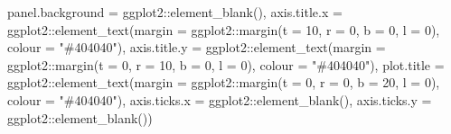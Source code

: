 \documentclass[
]{book}
\newenvironment{Shaded}{\begin{snugshade}}{\end{snugshade}}
\newcommand{\AttributeTok}[1]{\textcolor[rgb]{0.77,0.63,0.00}{#1}}
\newcommand{\DecValTok}[1]{\textcolor[rgb]{0.00,0.00,0.81}{#1}}
\newcommand{\FunctionTok}[1]{\textcolor[rgb]{0.00,0.00,0.00}{#1}}
\newcommand{\NormalTok}[1]{#1}
\newcommand{\SpecialCharTok}[1]{\textcolor[rgb]{0.00,0.00,0.00}{#1}}
\newcommand{\StringTok}[1]{\textcolor[rgb]{0.31,0.60,0.02}{#1}}
\begin{document}
\begin{Shaded}
\begin{Highlighting}[]
               \AttributeTok{panel.background =}\NormalTok{ ggplot2}\SpecialCharTok{::}\FunctionTok{element\_blank}\NormalTok{(),}
               \AttributeTok{axis.title.x =}\NormalTok{ ggplot2}\SpecialCharTok{::}\FunctionTok{element\_text}\NormalTok{(}\AttributeTok{margin =}\NormalTok{ ggplot2}\SpecialCharTok{::}\FunctionTok{margin}\NormalTok{(}\AttributeTok{t =} \DecValTok{10}\NormalTok{, }\AttributeTok{r =} \DecValTok{0}\NormalTok{, }\AttributeTok{b =} \DecValTok{0}\NormalTok{, }\AttributeTok{l =} \DecValTok{0}\NormalTok{), }\AttributeTok{colour =} \StringTok{"\#404040"}\NormalTok{),}
               \AttributeTok{axis.title.y =}\NormalTok{ ggplot2}\SpecialCharTok{::}\FunctionTok{element\_text}\NormalTok{(}\AttributeTok{margin =}\NormalTok{ ggplot2}\SpecialCharTok{::}\FunctionTok{margin}\NormalTok{(}\AttributeTok{t =} \DecValTok{0}\NormalTok{, }\AttributeTok{r =} \DecValTok{10}\NormalTok{, }\AttributeTok{b =} \DecValTok{0}\NormalTok{, }\AttributeTok{l =} \DecValTok{0}\NormalTok{), }\AttributeTok{colour =} \StringTok{"\#404040"}\NormalTok{),}
               \AttributeTok{plot.title =}\NormalTok{ ggplot2}\SpecialCharTok{::}\FunctionTok{element\_text}\NormalTok{(}\AttributeTok{margin =}\NormalTok{ ggplot2}\SpecialCharTok{::}\FunctionTok{margin}\NormalTok{(}\AttributeTok{t =} \DecValTok{0}\NormalTok{, }\AttributeTok{r =} \DecValTok{0}\NormalTok{, }\AttributeTok{b =} \DecValTok{20}\NormalTok{, }\AttributeTok{l =} \DecValTok{0}\NormalTok{), }\AttributeTok{colour =} \StringTok{"\#404040"}\NormalTok{),}
               \AttributeTok{axis.ticks.x =}\NormalTok{ ggplot2}\SpecialCharTok{::}\FunctionTok{element\_blank}\NormalTok{(),}
               \AttributeTok{axis.ticks.y =}\NormalTok{ ggplot2}\SpecialCharTok{::}\FunctionTok{element\_blank}\NormalTok{())}
\end{Highlighting}
\end{Shaded}
\end{document}
